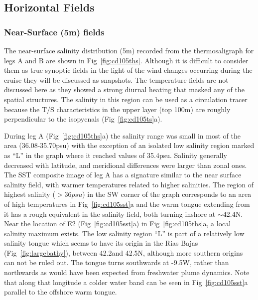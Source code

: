 \FloatBarrier
\subsection{Horizontal Fields}
\subsubsection{Near-Surface (5m) fields}
The near-surface salinity distribution (5m) recorded from the
thermosaligraph for legs A and B are shown in
Fig~\ref{fig:cd105ths}. Although it is difficult to consider them
as true synoptic fields in the light of the wind changes occurring
during the cruise they will be discussed as snapshots. The
temperature fields are not discussed here as they showed a strong
diurnal heating that masked any of the spatial structures. The
salinity in this region can be used as a circulation tracer
because the T/S characteristics in the upper layer (top 100m) are
roughly perpendicular to the isopycnals (Fig~\ref{fig:cd105ts}a).

During leg A (Fig~\ref{fig:cd105ths}a) the salinity range was
small in most of the area (36.08-35.70psu) with the exception of
an isolated low salinity region marked as ``L'' in the graph where
it reached values of 35.4psu. Salinity generally decreased with
latitude, and meridional differences were larger than zonal ones.
The SST composite image of leg A has a signature similar to the
near surface salinity field, with warmer temperatures related to
higher salinities. The region of highest salinity ($>36psu$) in
the SW corner of the graph corresponds to an area of high
temperatures in Fig~\ref{fig:cd105sst}a and the warm tongue
extending from it has a rough equivalent in the salinity field,
both turning inshore at $\sim$42.4\deg N. Near the location of E2
(Fig~\ref{fig:cd105sst}a) in Fig~\ref{fig:cd105ths}a, a local
salinity maximum exists. The low salinity region ``L'' is part of
a relatively low salinity tongue which seems to have its origin in
the Rias Bajas (Fig~\ref{fig:largebathy}), between 42.2\deg and
42.5\deg N, although more southern origins can not be ruled out.
The tongue turns southwards at -9.5\deg W, rather than northwards
as would have been expected from freshwater plume dynamics. Note
that along that longitude a colder water band can be seen in
Fig~\ref{fig:cd105sst}a parallel to the offshore warm tongue.


